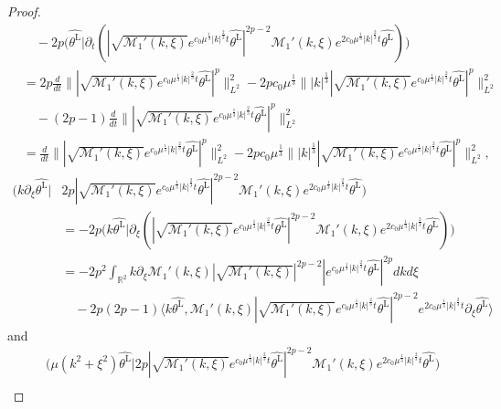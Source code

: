 \documentclass[10pt,a4paper]{amsart}
\newcommand{\pt}{\partial_t}
\begin{document}
\begin{proof}
\begin{align*}
			& \quad - 2p\big(  \widehat{\theta^{\mathrm{L}}} \big| \pt ( | \sqrt{\mathcal{M}_1'(k, \xi)} e^{c_0 \mu^\frac13 |k|^\frac23 t} \widehat{\theta^{\mathrm{L}} }|^{2p-2} \mathcal{M}_1'(k, \xi) e^{2c_0 \mu^\frac13 |k|^\frac23 t} \widehat{\theta^{\mathrm{L}} } ) \big)\\
			&= 2p \frac{d}{dt} \| | \sqrt{\mathcal{M}_1'(k, \xi)} e^{c_0 \mu^\frac13 |k|^\frac23 t} \widehat{\theta^{\mathrm{L}} }|^p \|_{L^2}^2 - 2p c_0 \mu^\frac13 \| |k|^\frac13 | \sqrt{\mathcal{M}_1'(k, \xi)} e^{c_0 \mu^\frac13 |k|^\frac23 t} \widehat{\theta^{\mathrm{L}} }|^p\|_{L^2}^2 \\
			& \quad - (2p  -1 ) \frac{d}{dt} \| | \sqrt{\mathcal{M}_1'(k, \xi)} e^{c_0 \mu^\frac13 |k|^\frac23 t} \widehat{\theta^{\mathrm{L}} }|^p \|_{L^2}^2 \\
			&=  \frac{d}{dt} \| | \sqrt{\mathcal{M}_1'(k, \xi)} e^{c_0 \mu^\frac13 |k|^\frac23 t} \widehat{\theta^{\mathrm{L}} }|^p \|_{L^2}^2  - 2p c_0 \mu^\frac13 \| |k|^\frac13 | \sqrt{\mathcal{M}_1'(k, \xi)} e^{c_0 \mu^\frac13 |k|^\frac23 t} \widehat{\theta^{\mathrm{L}} }|^p\|_{L^2}^2 ,
		\end{align*}
		\begin{align*}
			\big( k\partial_\xi  \widehat{\theta^{\mathrm{L}}} \big| &2p | \sqrt{\mathcal{M}_1'(k, \xi)} e^{c_0 \mu^\frac13 |k|^\frac23 t} \widehat{\theta^{\mathrm{L}} }|^{2p-2} \mathcal{M}_1'(k, \xi) e^{2c_0 \mu^\frac13 |k|^\frac23 t} \widehat{\theta^{\mathrm{L}} } \big) \\
			&=  - 2p \big( k \widehat{\theta^{\mathrm{L}}} \big| \partial_\xi ( | \sqrt{\mathcal{M}_1'(k, \xi)} e^{c_0 \mu^\frac13 |k|^\frac23 t} \widehat{\theta^{\mathrm{L}} }|^{2p-2} \mathcal{M}_1'(k, \xi) e^{2c_0 \mu^\frac13 |k|^\frac23 t} \widehat{\theta^{\mathrm{L}} } ) \big)\\
			&= -2p^2 \int_{\mathbb{R}^2} k\partial_\xi  \mathcal{M}_1'(k, \xi)    | \sqrt{\mathcal{M}_1'(k, \xi)} |^{2p-2} |e^{c_0 \mu^\frac13 |k|^\frac23 t} \widehat{\theta^{\mathrm{L}} }|^{2p} dkd\xi \\
			&\quad  -  2p(2p-1)\langle k \widehat{\theta^{\mathrm{L}}},   \mathcal{M}_1'(k, \xi)  | \sqrt{\mathcal{M}_1'(k, \xi)} e^{c_0 \mu^\frac13 |k|^\frac23 t} \widehat{\theta^{\mathrm{L}} }|^{2p-2}   e^{2c_0 \mu^\frac13 |k|^\frac23 t}    \partial_\xi\widehat{\theta^{\mathrm{L}} } \rangle
		\end{align*}
		and
		\begin{align*}
			&\big( \mu(k^2 + \xi^2) \widehat{\theta^{\mathrm{L}} }  \big| 2p | \sqrt{\mathcal{M}_1'(k, \xi)} e^{c_0 \mu^\frac13 |k|^\frac23 t} \widehat{\theta^{\mathrm{L}} }|^{2p-2} \mathcal{M}_1'(k, \xi) e^{2c_0 \mu^\frac13 |k|^\frac23 t} \widehat{\theta^{\mathrm{L}} } \big) \\

\end{align*}
\end{proof}
\end{document}
